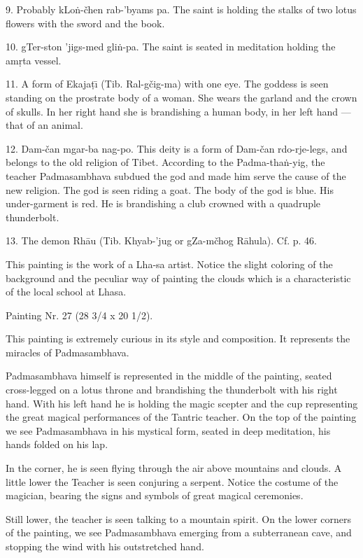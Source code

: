 \documentclass[a4paper, 12pt, oneside]{article}
\begin{document}
9. Probably kLo\.{n}-čhen rab-'byams pa. The saint is holding the stalks of two lotus flowers with the sword and the book.

10. gTer-ston 'jigs-med gli\.{n}-pa. The saint is seated in meditation holding the am\d{r}ta vessel.

11. A form of Ekaja\d{t}\={\i} (Tib. Ral-gčig-ma) with one eye. The goddess is seen standing on the prostrate body of a woman. She wears the garland and the crown of skulls. In her right hand she is brandishing a human body, in her left hand --- that of an animal.

12. Dam-čan mgar-ba nag-po. This deity is a form of Dam-čan rdo-rje-legs, and belongs to the old religion of Tibet. According to the Padma-tha\.{n}-yig, the teacher Padmasambhava subdued the god and made him serve the cause of the new religion. The god is seen riding a goat. The body of the god is blue. His under-garment is red. He is brandishing a club crowned with a quadruple thunderbolt.

13. The demon Rh\={a}u (Tib. Khyab-'jug or gZa-mčhog R\={a}hula). Cf. p. 46.

This painting is the work of a Lha-sa artist. Notice the slight coloring of the background and the peculiar way of painting the clouds which is a characteristic of the local school at Lhasa.

\bigskip

Painting Nr. 27 (28 3/4 x 20 1/2).

\bigskip

This painting is extremely curious in its style and composition. It represents the miracles of Padmasambhava.

Padmasambhava himself is represented in the middle of the painting, seated cross-legged on a lotus throne and brandishing the thunderbolt with his right hand. With his left hand he is holding the magic scepter and the cup representing the great magical performances of the Tantric teacher. On the top of the painting we see Padmasambhava in his mystical form, seated in deep meditation, his hands folded on his lap.

In the corner, he is seen flying through the air above mountains and clouds. A little lower the Teacher is seen conjuring a serpent. Notice the costume of the magician, bearing the signs and symbols of great magical ceremonies.

Still lower, the teacher is seen talking to a mountain spirit. On the lower corners of the painting, we see Padmasambhava emerging from a subterranean cave, and stopping the wind with his outstretched hand.
\end{document}
